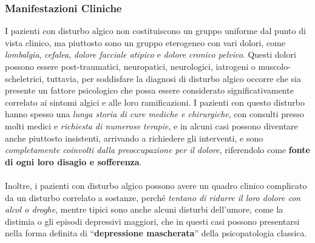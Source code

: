 \subsubsection{Manifestazioni Cliniche}

I pazienti con disturbo algico non costituiscono un gruppo uniforme dal
punto di vista clinico, ma piuttosto sono un gruppo eterogeneo con vari
dolori, come \emph{lombalgia}, \emph{cefalea}, \emph{dolore facciale
atipico} e \emph{dolore} \emph{cronico pelvico}. Questi dolori possono
essere post-traumatici, neuropatici, neurologici, iatrogeni o
muscolo-scheletrici, tuttavia, per soddisfare la diagnosi di disturbo
algico occorre che sia presente un fattore psicologico che possa essere
considerato significativamente correlato ai sintomi algici e alle loro
ramificazioni. I pazienti con questo disturbo hanno spesso una
\emph{lunga storia di cure mediche e chirurgiche}, con consulti presso
molti medici e \emph{richiesta di numerose terapie}, e in alcuni casi
possono diventare anche piuttosto insistenti, arrivando a richiedere gli
interventi, e sono \emph{completamente coinvolti dalla preoccupazione
per il dolore}, riferendolo come \textbf{fonte di ogni loro disagio e
sofferenza}.
\\\\
Inoltre, i pazienti con disturbo algico possono avere un quadro clinico
complicato da un disturbo correlato a sostanze, perché \emph{tentano di
ridurre il loro dolore con alcol o droghe}, mentre tipici sono anche
alcuni disturbi dell'umore, come la distimia o gli episodi depressivi
maggiori, che in questi casi possono presentarsi nella forma definita di
``\textbf{depressione mascherata}'' della psicopatologia classica.
